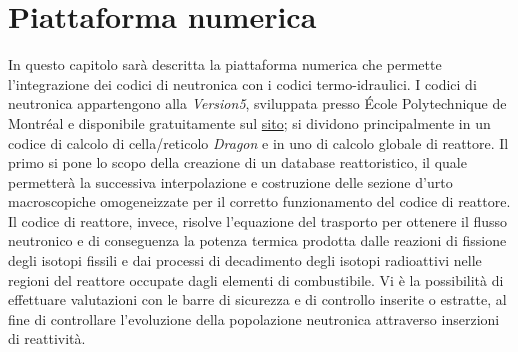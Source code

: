 \chapter{Piattaforma numerica \label{cap4}}

In questo capitolo sarà descritta la piattaforma numerica che permette 
l'integrazione dei codici di neutronica con i codici termo-idraulici.
I codici di neutronica appartengono alla \textit{Version5}, sviluppata presso 
\'Ecole 
Polytechnique de Montréal e disponibile gratuitamente sul 
\href{https://www.polymtl.ca/merlin/version5.htm}{sito}; si dividono 
principalmente in un 
codice di calcolo di cella/reticolo \textit{Dragon} e in uno di calcolo globale 
di 
reattore.
Il primo si pone lo scopo della creazione di un database reattoristico, il 
quale 
permetterà la successiva interpolazione e costruzione delle sezione d'urto 
macroscopiche omogeneizzate per il corretto funzionamento del codice 
di reattore.
Il codice di reattore, invece, risolve l'equazione del trasporto per ottenere 
il 
flusso neutronico e di conseguenza la potenza termica prodotta dalle reazioni di
fissione degli isotopi fissili e dai processi di decadimento degli isotopi
radioattivi nelle regioni del reattore occupate dagli elementi di 
combustibile.
Vi è la possibilità di effettuare valutazioni con le barre di sicurezza e di 
controllo inserite o estratte, al fine di controllare l'evoluzione della 
popolazione neutronica attraverso inserzioni di reattività. 

